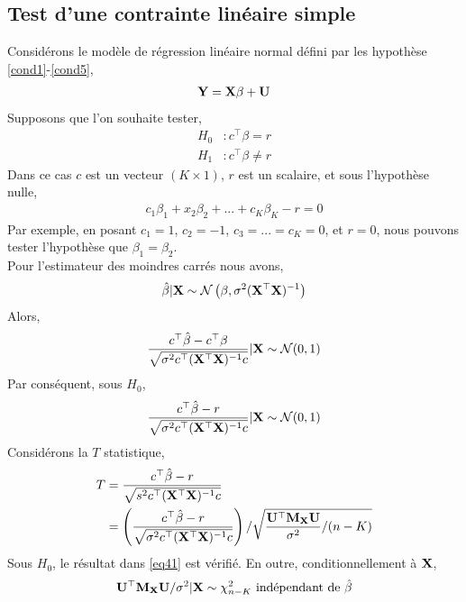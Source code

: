 \subsection{Test d'une contrainte linéaire simple}
Considérons le modèle de régression linéaire normal défini par les hypothèse \ref{cond1}-\ref{cond5},
\begin{align*}
\mathbf Y = \mathbf X\beta + \mathbf U
\end{align*}
Supposons que l'on souhaite tester,
\begin{align*}
H_0&: c^\top\beta=r\\
H_1&: c^\top\beta \neq r
\end{align*}
Dans ce cas $c$ est un vecteur $(K\times 1)$, $r$ est un scalaire, et sous l'hypothèse nulle,
\begin{align*}
c_1\beta_1 + x_2\beta_2+...+c_K\beta_K-r=0
\end{align*}
Par exemple, en posant $c_1 = 1$, $c_2=-1$, $c_3 = ...=c_K = 0$, et $r = 0$, nous pouvons tester l'hypothèse que $\beta_1=\beta_2$.\\
Pour l'estimateur des moindres carrés nous avons,
\begin{align}
\hat{\beta}|\mathbf X \sim \mathcal{N}\left(\beta, \sigma^2(\mathbf X^\top\mathbf X)^{-1}\right)
\label{eq39}
\end{align} 
Alors,
\begin{align}
\frac{c^\top\hat{\beta} - c^\top\beta}{\sqrt{\sigma^2c^\top(\mathbf X^\top\mathbf X)^{-1}c}}
| \mathbf X \sim \mathcal{N}(0, 1)
\label{eq40}
\end{align} 
Par conséquent, sous $H_0$,
\begin{align}
\frac{c^\top\hat{\beta} - r}
{\sqrt{\sigma^2c^\top(\mathbf X^\top\mathbf X)^{-1}c}}
| \mathbf X \sim \mathcal{N}(0, 1)
\label{eq41}
\end{align} 
Considérons la $T$ statistique,
\begin{align*}
T &= \frac{c^\top\hat{\beta} - r}
{\sqrt{s^2c^\top(\mathbf X^\top\mathbf X)^{-1}c}}\\
&=\left(
\frac{c^\top\hat{\beta} - r}
{\sqrt{\sigma^2c^\top(\mathbf X^\top\mathbf X)^{-1}c}}
\right)
/
\sqrt{\frac{\mathbf U^\top\mathbf M_\mathbf X\mathbf U}{\sigma^2}/(n-K)}
\end{align*}
Sous $H_0$, le résultat dans \eqref{eq41} est vérifié. En outre, conditionnellement à $\mathbf X$,
\begin{align}
\boldU^\top\boldM_\boldX\boldU/\sigma^2 | \boldX\sim \chi^2_{n-K} \ \textrm{indépendant de}  \ \hat{\beta} 
\label{eq42}
\end{align}
